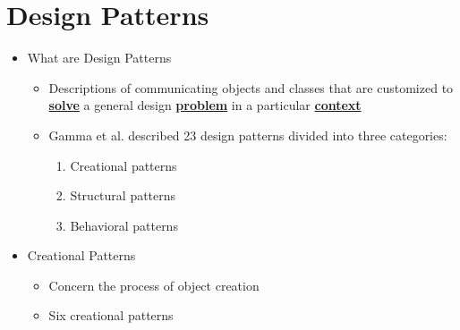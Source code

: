 \section{Design Patterns}
\begin{itemize}
	\item What are Design Patterns
	\begin{itemize}
		\item Descriptions of communicating objects and classes that are customized to \textbf{\underline{solve}} a general design \textbf{\underline{problem}} in a particular \textbf{\underline{context}}
		\item 	Gamma et al. described 23 design patterns divided into three categories:
		\begin{enumerate}
			\item Creational patterns
			\item Structural patterns
			\item Behavioral patterns
		\end{enumerate}
	\end{itemize}

	\item Creational Patterns
	\begin{itemize}
		\item Concern the process of object creation
		\item Six creational patterns
		\vspace{-\itemsep}
	\end{itemize}


\end{itemize}
